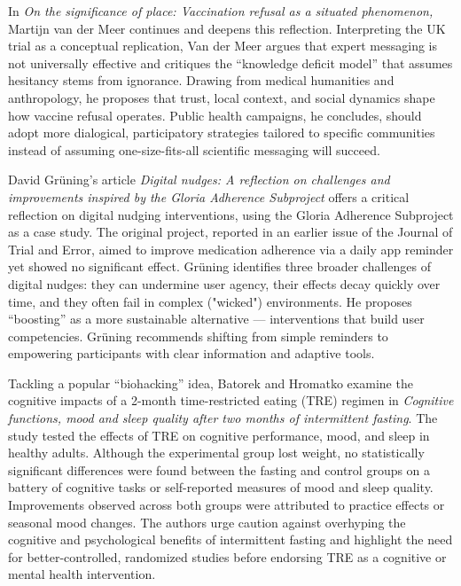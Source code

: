 \documentclass[authordate, empirical]{jote-new-article}
\begin{document}
	In \emph{On the significance of place: Vaccination refusal as a situated phenomenon,} Martijn van der Meer continues and deepens this reflection. Interpreting the UK trial as a conceptual replication, Van der Meer argues that expert messaging is not universally effective and critiques the “knowledge deficit model” that assumes hesitancy stems from ignorance. Drawing from medical humanities and anthropology, he proposes that trust, local context, and social dynamics shape how vaccine refusal operates. Public health campaigns, he concludes, should adopt more dialogical, participatory strategies tailored to specific communities instead of assuming one-size-fits-all scientific messaging will succeed.



	David Grüning's article \emph{Digital nudges: A reflection on challenges and improvements inspired by the Gloria Adherence Subproject} offers a critical reflection on digital nudging interventions, using the Gloria Adherence Subproject as a case study. The original project, reported in an earlier issue of the Journal of Trial and Error, aimed to improve medication adherence via a daily app reminder yet showed no significant effect. Grüning identifies three broader challenges of digital nudges: they can undermine user agency, their effects decay quickly over time, and they often fail in complex ("wicked") environments. He proposes “boosting” as a more sustainable alternative — interventions that build user competencies. Grüning recommends shifting from simple reminders to empowering participants with clear information and adaptive tools.



	Tackling a popular “biohacking” idea, Batorek and Hromatko examine the cognitive impacts of a 2-month time-restricted eating (TRE) regimen in \emph{Cognitive functions, mood and sleep quality after two months of intermittent fasting}. The study tested the effects of TRE on cognitive performance, mood, and sleep in healthy adults. Although the experimental group lost weight, no statistically significant differences were found between the fasting and control groups on a battery of cognitive tasks or self-reported measures of mood and sleep quality. Improvements observed across both groups were attributed to practice effects or seasonal mood changes. The authors urge caution against overhyping the cognitive and psychological benefits of intermittent fasting and highlight the need for better-controlled, randomized studies before endorsing TRE as a cognitive or mental health intervention.
\end{document}
